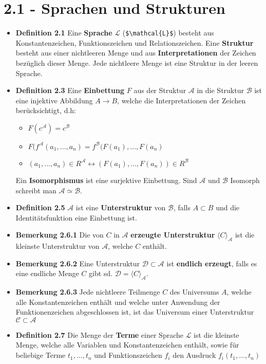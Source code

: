 \documentclass{scrartcl}
\begin{document}
\section*{2.1 - Sprachen und Strukturen}
\begin{itemize}
    \item \textbf{Definition 2.1} Eine \textbf{Sprache} $\mathcal{L}$ (\texttt{\$\textbackslash mathcal\{L\}\$}) besteht aus Konstantenzeichen, Funktionszeichen und Relationszeichen. Eine \textbf{Struktur} besteht aus einer nichtleeren Menge und aus \textbf{Interpretationen} der Zeichen bezüglich dieser Menge. Jede nichtleere Menge ist eine Struktur in der leeren Sprache.
    \item \textbf{Definition 2.3} Eine \textbf{Einbettung} $F$ aus der Struktur $\mathcal{A}$ in die Struktur $\mathcal{B}$ ist eine injektive Abbildung $A \to B$, welche die Interpretationen der Zeichen berücksichtigt, d.h:
    \begin{itemize}
        \item $F(c^\mathcal{A}) = c^\mathcal{B}$
        \item $F(f^\mathcal{A}(a_1,\hdots,a_n) = f^\mathcal{B}(F(a_1), \hdots , F(a_n)$
        \item $(a_1, \hdots, a_n) \in R^\mathcal{A} \leftrightarrow (F(a_1),\hdots, F(a_n)) \in R^\mathcal{B}$
    \end{itemize}
    Ein \textbf{Isomorphismus} ist eine surjektive Einbettung. Sind $\mathcal{A}$ und $\mathcal{B}$ Isomorph schreibt man $\mathcal{A} \simeq \mathcal{B}$.
    \item \textbf{Definition 2.5} $\mathcal{A}$ ist eine \textbf{Unterstruktur} von $\mathcal{B}$, falls $A \subset B$ und die Identitätsfunktion eine Einbettung ist.
    \item \textbf {Bemerkung 2.6.1} Die von $C$ in $\mathcal{A}$ \textbf{erzeugte Unterstruktur} $\langle C \rangle_{\mathcal{A}}$ ist die kleinste Unterstruktur von $\mathcal{A}$, welche $C$ enthält.
    \item \textbf {Bemerkung 2.6.2} Eine Unterstruktur $\mathcal{D} \subset \mathcal{A}$ ist \textbf{endlich erzeugt}, falls es eine endliche Menge $C$ gibt sd. $\mathcal{D} = \langle C \rangle_{\mathcal{A}}$. \item \textbf {Bemerkung 2.6.3} Jede nichtleere Teilmenge $C$ des Universums $A$, welche alle Konstantenzeichen enthält und welche unter Anwendung der Funktionenzeichen abgeschlossen ist, ist das Universum einer Unterstruktur $\mathcal{C} \subset \mathcal{A}$
    \item \textbf{Definition 2.7} Die Menge der \textbf{Terme} einer Sprache $\mathcal{L}$ ist die kleinste Menge, welche alle Variablen und Konstantenzeichen enthält, sowie für beliebige Terme $t_1, \hdots, t_n$ und Funktionszeichen $f_i$ den Ausdruck $f_i(t_1, \hdots, t_n)$

\end{itemize}
\end{document}
